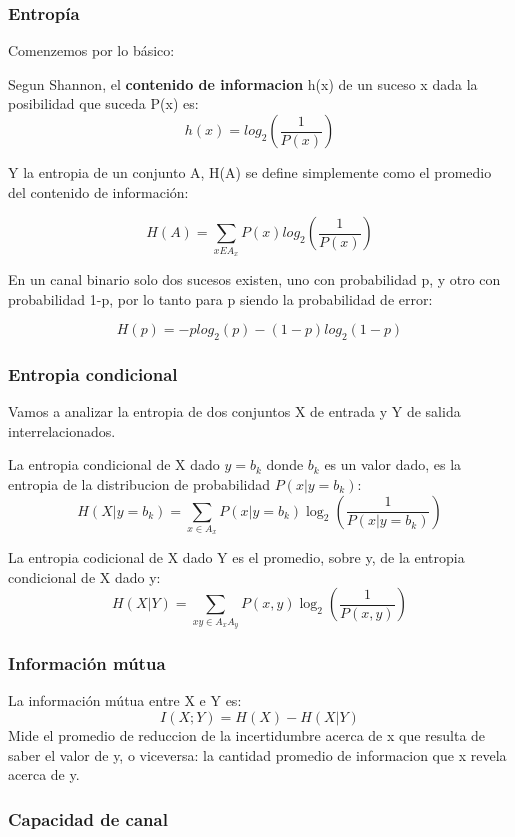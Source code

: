 \documentclass[12pt,twoside,openright]{moddalthesis}
\begin{document}
\subsubsection{Entropía}

Comenzemos por lo básico:

Segun Shannon, el \textbf{contenido de informacion} h(x) de un suceso x dada la posibilidad que suceda P(x) es:
$$ h(x) = log_{2}\left(\frac{1}{P(x)}\right) $$

Y la entropia de un conjunto A, H(A) se define simplemente como el promedio del contenido de información:

$$ H(A) = \sum_{x E A_{x}} P(x)log_{2}\left(\frac{1}{P(x)}\right)$$

En un canal binario solo dos sucesos existen, uno con probabilidad p, y otro con probabilidad 1-p, por lo tanto para p siendo la probabilidad de error:

$$ H(p) = -p log_{2}(p)-(1-p)log_{2}(1-p) $$

\subsubsection{Entropia condicional}

Vamos a analizar la entropia de dos conjuntos X de entrada y Y de salida interrelacionados.

La entropia condicional de X dado $y=b_k$ donde $b_k$ es un valor dado, es la entropia de la distribucion de probabilidad $P(x|y=b_{k})$:
$$H(X|y=b_{k}) = \sum_{x \in A_{x}} P(x | y=b_{k})\log_2\left(\frac{1}{P(x | y=b_{k})}\right) $$

La entropia codicional de X dado Y es el promedio, sobre y, de la entropia condicional de X dado y:
$$H(X|Y) =  \sum_{xy \in A_{x}A_{y}} P(x,y)\log_2\left(\frac{1}{P(x,y)}\right) $$

\subsubsection{Información mútua}
La información mútua entre X e Y es:
$$I(X;Y) = H(X)-H(X|Y)$$
Mide el promedio de reduccion de la incertidumbre acerca de x que resulta de saber el valor de y, o viceversa: la cantidad promedio de informacion que x revela acerca de y.

\subsubsection{Capacidad de canal}
\end{document}
